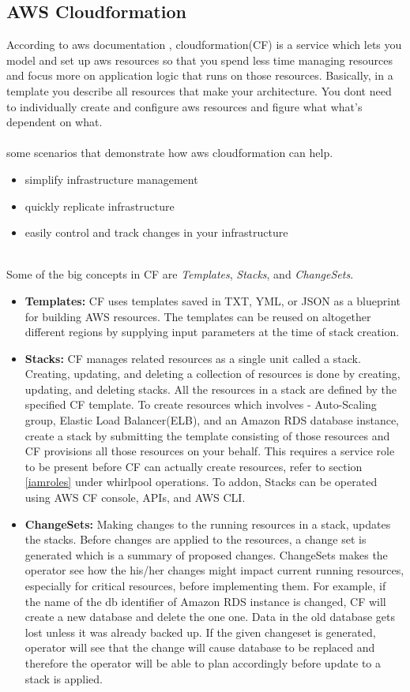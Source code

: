 \subsection{AWS Cloudformation}
According to aws documentation \cite{docker}, cloudformation(CF) is a service which lets you model and set up
aws resources so that you spend less time managing resources and focus more on application logic that runs
on those resources. Basically, in a template you describe all resources that make your architecture. You
dont need to individually create and configure aws resources and figure what what's dependent on what.
\\
\\
some scenarios that demonstrate how aws cloudformation can help.
\begin{itemize}
    \item simplify infrastructure management
    \item quickly replicate infrastructure
    \item easily control and track changes in your infrastructure
\end{itemize}
\\
Some of the big concepts in CF are \textit{Templates}, \textit{Stacks}, and \textit{ChangeSets}.
\begin{itemize}
\item \textbf{Templates:} CF uses templates saved in TXT, YML, or JSON as a blueprint for building AWS
  resources. The templates can be reused on altogether different regions by supplying input parameters at the time of stack creation.
\item \textbf{Stacks:} CF manages related resources as a single unit called a stack. Creating, updating,
  and deleting a collection of resources is done by creating, updating, and deleting stacks. All the
  resources in a stack are defined by the specified CF template. To create resources which involves 
  - Auto-Scaling group, Elastic Load Balancer(ELB), and an Amazon RDS database instance, create a stack by
  submitting the template consisting of those resources and CF provisions all those resources on your
  behalf. This requires a service role to be present before CF can actually create resources, refer to
  section \ref{iamroles} under whirlpool operations. To addon, Stacks can be operated using AWS CF console, APIs, and AWS CLI.
\item \textbf{ChangeSets:} Making changes to the running resources in a stack, updates the stacks. Before
  changes are applied to the resources, a change set is generated which is a summary of proposed changes.
  ChangeSets makes the operator see how the his/her changes might impact current running resources,
  especially for critical resources, before implementing them. For example, if the name of the db
  identifier of Amazon RDS instance is changed, CF will create a new database and delete the one one.
  Data in the old database gets lost unless it was already backed up. If the given changeset is generated,
  operator will see that the change will cause database to be replaced and therefore the operator will be
  able to plan accordingly before update to a stack is applied.
\end{itemize}

